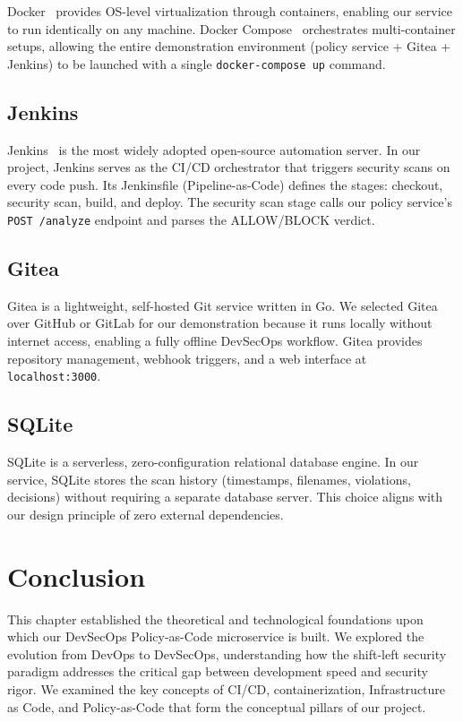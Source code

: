 Docker~\cite{docker} provides OS-level virtualization through containers, enabling our service to run identically on any machine. Docker Compose~\cite{dockercompose} orchestrates multi-container setups, allowing the entire demonstration environment (policy service + Gitea + Jenkins) to be launched with a single \texttt{docker-compose up} command.

\subsection{Jenkins}

Jenkins~\cite{jenkins} is the most widely adopted open-source automation server. In our project, Jenkins serves as the CI/CD orchestrator that triggers security scans on every code push. Its Jenkinsfile (Pipeline-as-Code) defines the stages: checkout, security scan, build, and deploy. The security scan stage calls our policy service's \texttt{POST /analyze} endpoint and parses the ALLOW/BLOCK verdict.

\subsection{Gitea}

Gitea is a lightweight, self-hosted Git service written in Go. We selected Gitea over GitHub or GitLab for our demonstration because it runs locally without internet access, enabling a fully offline DevSecOps workflow. Gitea provides repository management, webhook triggers, and a web interface at \texttt{localhost:3000}.

\subsection{SQLite}

SQLite is a serverless, zero-configuration relational database engine. In our service, SQLite stores the scan history (timestamps, filenames, violations, decisions) without requiring a separate database server. This choice aligns with our design principle of zero external dependencies.

\section{Conclusion}

This chapter established the theoretical and technological foundations upon which our DevSecOps Policy-as-Code microservice is built. We explored the evolution from DevOps to DevSecOps, understanding how the shift-left security paradigm addresses the critical gap between development speed and security rigor. We examined the key concepts of CI/CD, containerization, Infrastructure as Code, and Policy-as-Code that form the conceptual pillars of our project.

